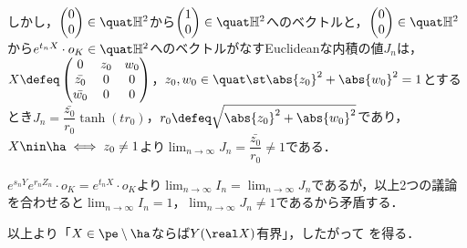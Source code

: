 \begin{npfwn}
  しかし，$
  \begin{pmatrix}
    0 \\ 0 
  \end{pmatrix}
  \in \quat\mathbb{H}^2 $から$
  \begin{pmatrix}
    1 \\ 0
  \end{pmatrix}
  \in \quat\mathbb{H}^2 $へのベクトルと，$
  \begin{pmatrix}
    0 \\ 0 
  \end{pmatrix}
  \in \quat\mathbb{H}^2 $から$e^{t_nX}\cdot o_K \in \quat \mathbb{H}^2 $へのベクトルがなすEuclideanな内積の値$J_n$は，$X \defeq   \begin{pmatrix}
    0 & z_0 & w_0 \\
    \bar{z_0} & 0 & 0 \\
    \bar{w_0} & 0 & 0 
  \end{pmatrix}$，$z_0,w_0\in \quat \st \abs{z_0}^2 +\abs{w_0}^2  = 1 $とするとき$J_n = \dfrac{\bar{z_0}}{r_0}\tanh (tr_0) $，$r_0\defeq \sqrt{\abs{z_0}^2 + \abs{w_0}^2 } $であり，$X\nin \ha \iff z_0\neq 1$より$\lim_{n\to \infty}J_n = \dfrac{\bar{z_0}}{r_0}\neq 1 $である．

  $e^{s_n Y}e^{r_n Z_n}\cdot o_K = e^{t_n X}\cdot o_K$より$ \lim_{n\to \infty} I_n = \lim_{n\to \infty}J_n  $であるが，以上2つの議論を合わせると$\lim_{n\to \infty} I_n= 1$，$\lim_{n\to \infty}J_n \neq 1 $であるから矛盾する．
  

  以上より「$X\in \pe\setminus\ha$ならば$Y(\real X) $有界」，したがって  を得る．  
\end{npfwn}


